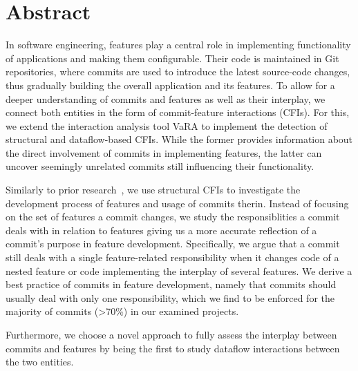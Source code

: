 \begingroup
\let\clearpage\relax
\let\cleardoublepage\relax
\let\cleardoublepage\relax

\chapter*{Abstract}

In software engineering, features play a central role in implementing functionality of applications and making them configurable. 
Their code is maintained in Git repositories, where commits are used to introduce the latest source-code changes, thus gradually building the overall application and its features. 
To allow for a deeper understanding of commits and features as well as their interplay, we connect both entities in the form of commit-feature interactions (CFIs).
For this, we extend the interaction analysis tool VaRA to implement the detection of structural and dataflow-based CFIs.
While the former provides information about the direct involvement of commits in implementing features, the latter can uncover seemingly unrelated commits still influencing their functionality.

Similarly to prior research~\cite{michelon2021lifecycle}, we use structural CFIs to investigate the development process of features and usage of commits therin.
Instead of focusing on the set of features a commit changes, we study the responsiblities a commit deals with in relation to features giving us a more accurate reflection of a commit's purpose in feature development.
Specifically, we argue that a commit still deals with a single feature-related responsibility when it changes code of a nested feature or code implementing the interplay of several features.
We derive a best practice of commits in feature development, namely that commits should usually deal with only one responsibility, which we find to be enforced for the majority of commits (>70\%) in our examined projects. 

Furthermore, we choose a novel approach to fully assess the interplay between commits and features by being the first to study dataflow interactions between the two entities. %


